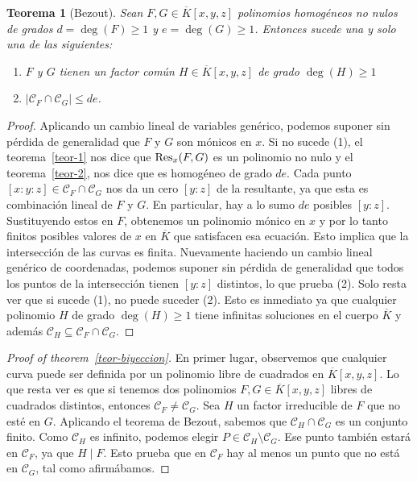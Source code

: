 \documentclass[a4paper, 11pt]{article}
\newcounter{numerodetema}
\theoremstyle{plain}
\newtheorem{teor}{Teorema}[numerodetema]
\theoremstyle{definition}
\begin{document}
\begin{teor}[Bezout]
Sean $F,G\in \overline{K}[x,y,z]$ polinomios homogéneos no nulos de grados
$d=\deg(F)\geq 1$ y $e=\deg(G)\geq 1$. Entonces sucede una y solo una de las
siguientes:
\begin{enumerate}
\item $F$ y $G$ tienen un factor común $H\in\overline{K}[x,y,z]$ de grado $\deg(H)\geq 1$
\item $\left|\mathcal{C}_F\cap\mathcal{C}_G\right|\leq de$.
\end{enumerate}
\end{teor}
\begin{proof}
Aplicando un cambio lineal de variables genérico, podemos suponer sin pérdida de
generalidad que $F$ y $G$ son mónicos en $x$. Si no sucede (1), el teorema~\ref{teor-1}
nos dice que ${\rm Res}_x(F,G)$ es un polinomio no nulo y el teorema~\ref{teor-2},
nos dice que es homogéneo de grado $de$. Cada punto $[x:y:z]\in\mathcal{C}_F
\cap\mathcal{C}_G$ nos da un cero $[y:z]$ de la resultante, ya que esta
es combinación lineal de $F$ y $G$. En particular, hay a lo sumo $de$ posibles $[y:z]$.
Sustituyendo estos en $F$, obtenemos un polinomio mónico en $x$ y por lo tanto
finitos posibles valores de $x$ en $\overline{K}$ que satisfacen esa ecuación. Esto
implica que la intersección de las curvas es finita. Nuevamente haciendo un cambio
lineal genérico de coordenadas, podemos suponer sin pérdida de generalidad que todos
los puntos de la intersección tienen $[y:z]$ distintos, lo que prueba (2). Solo
resta ver que si sucede (1), no puede suceder (2). Esto es inmediato ya que cualquier
polinomio $H$ de grado $\deg(H)\geq 1$ tiene infinitas soluciones en el cuerpo
$\overline{K}$ y además $\mathcal{C}_H\subseteq\mathcal{C}_F\cap\mathcal{C}_G$.
\end{proof}

\begin{proof}[Proof of theorem~\ref{teor-biyeccion}]
En primer lugar, observemos que cualquier curva puede ser definida por un polinomio
libre de cuadrados en $\overline{K}[x,y,z]$. Lo que resta ver es que si tenemos dos
polinomios $F,G\in\overline{K}[x,y,z]$ libres de cuadrados distintos, entonces
$\mathcal{C}_F\neq\mathcal{C}_G$. Sea $H$ un factor irreducible de $F$ que no esté
en $G$. Aplicando el teorema de Bezout, sabemos que $\mathcal{C}_H\cap\mathcal{C}_G$
es un conjunto finito. Como $\mathcal{C}_H$ es infinito, podemos elegir $P\in\mathcal{C}_H\setminus\mathcal{C}_G$. Ese punto también estará en $\mathcal{C}_F$, ya que $H\mid F$.
Esto prueba que en $\mathcal{C}_F$ hay al menos un punto que no está en $\mathcal{C}_G$,
tal como afirmábamos.
\end{proof}
\end{document}
